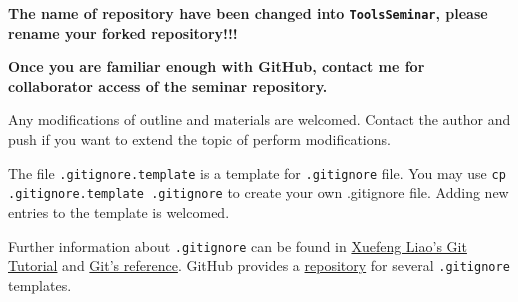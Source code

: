 \documentclass[english]{pkupaper}
\begin{document}
\textbf{The name of repository have been changed into \texttt{ToolsSeminar}, please rename your forked repository!!!}

\textbf{Once you are familiar enough with GitHub, contact me for collaborator access of the seminar repository.}

Any modifications of outline and materials are welcomed. Contact the author and push if you want to extend the topic of perform modifications.

The file \verb".gitignore.template" is a template for \verb".gitignore" file. You may use \verb"cp .gitignore.template .gitignore" to create your own .gitignore file. Adding new entries to the template is welcomed.

Further information about \verb".gitignore" can be found in \href{https://www.liaoxuefeng.com/wiki/0013739516305929606dd18361248578c67b8067c8c017b000/0013758404317281e54b6f5375640abbb11e67be4cd49e0000}{Xuefeng Liao's Git Tutorial} and \href{https://git-scm.com/docs/gitignore}{Git's reference}. GitHub provides a \href{https://github.com/github/gitignore}{repository} for several \verb".gitignore" templates.

	
\end{document}
